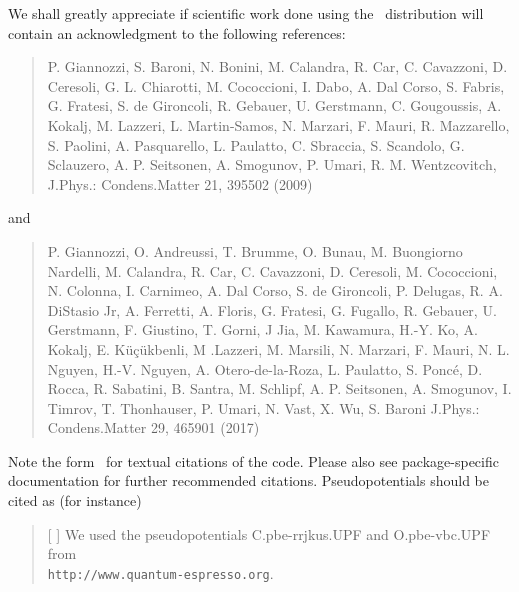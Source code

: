 We shall greatly appreciate if scientific work done using the \qe\ 
distribution will contain an acknowledgment to the following references:
\begin{quote}
P. Giannozzi, S. Baroni, N. Bonini, M. Calandra, R. Car, C. Cavazzoni,
D. Ceresoli, G. L. Chiarotti, M. Cococcioni, I. Dabo, A. Dal Corso,
S. Fabris, G. Fratesi, S. de Gironcoli, R. Gebauer, U. Gerstmann,
C. Gougoussis, A. Kokalj, M. Lazzeri, L. Martin-Samos, N. Marzari,
F. Mauri, R. Mazzarello, S. Paolini, A. Pasquarello, L. Paulatto,
C. Sbraccia, S. Scandolo, G. Sclauzero, A. P. Seitsonen, A. Smogunov,
P. Umari, R. M. Wentzcovitch,
	J.Phys.: Condens.Matter 21, 395502 (2009)
\end{quote}
and
\begin{quote}
P. Giannozzi, O. Andreussi, T. Brumme, O. Bunau, M. Buongiorno Nardelli, 
M. Calandra, R. Car, C. Cavazzoni, D. Ceresoli, M. Cococcioni, N. Colonna, 
I. Carnimeo, A. Dal Corso, S. de Gironcoli, P. Delugas, R. A. DiStasio Jr,
A. Ferretti, A. Floris, G. Fratesi, G. Fugallo, R. Gebauer, U. Gerstmann,
F. Giustino, T. Gorni, J Jia, M. Kawamura, H.-Y. Ko, A. Kokalj, 
E. K\"u\c{c}\"ukbenli, M .Lazzeri, M. Marsili, N. Marzari, F.  Mauri, 
N. L. Nguyen, H.-V. Nguyen, A. Otero-de-la-Roza, L. Paulatto, S. Ponc\'e, 
D. Rocca, R. Sabatini, B. Santra, M. Schlipf, A. P. Seitsonen, A. Smogunov,
I. Timrov, T. Thonhauser, P. Umari, N. Vast, X. Wu, S. Baroni
	J.Phys.: Condens.Matter 29, 465901 (2017)
\end{quote}

Note the form \qe\ for textual citations of the code.
Please also see package-specific documentation for
further recommended citations.
Pseudopotentials should be cited as (for instance)
\begin{quote}
[ ] We used the pseudopotentials C.pbe-rrjkus.UPF
and O.pbe-vbc.UPF from\\
\texttt{http://www.quantum-espresso.org}.
\end{quote}
